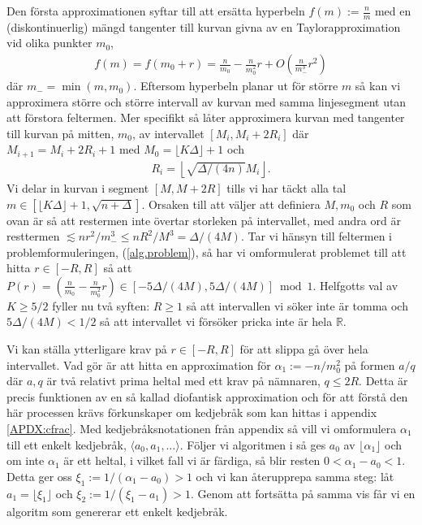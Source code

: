 Den första approximationen syftar till att ersätta hyperbeln \(f(m) := \frac{n}{m}\) med en (diskontinuerlig) mängd tangenter till kurvan givna av en Taylorapproximation vid olika punkter \(m_0\),
\begin{align*}
    f(m) = f(m_0 + r) = \frac{n}{m_0} - \frac{n}{m_0^2} r + O\left(\frac{n}{m_-^3} r^2 \right)
\end{align*} %
där \(m_- = \min(m, m_0)\). Eftersom hyperbeln planar ut för större $m$ så kan vi approximera större och större intervall av kurvan med samma linjesegment utan att förstora feltermen. Mer specifikt så låter \cite{HaraldSieve} approximera kurvan med tangenter till kurvan på mitten, $m_0$, av intervallet \([M_i, M_i + 2R_i]\) där  $M_{i + 1} = M_i + 2R_i + 1$ med $M_0 = \lfloor K \Delta \rfloor + 1$ och
\begin{align*}%
    R_i = \left\lfloor \sqrt{\Delta/(4n)} M_i \right\rfloor .
\end{align*}
Vi delar in kurvan i segment \([M, M + 2R]\) tills vi har täckt alla tal \(m \in [  \lfloor K \Delta \rfloor + 1, \sqrt{n + \Delta}]\). Orsaken till att \cite{HaraldSieve} väljer att definiera \(M, m_0\) och \(R\) som ovan är så att restermen inte övertar storleken på intervallet, med andra ord är resttermen \(\lesssim nr^2/m_-^3 \leq nR^2/M^3 = \Delta / (4M)\). Tar vi hänsyn till feltermen i problemformuleringen, (\ref{alg.problem}), så har vi omformulerat problemet till att hitta \(r \in [-R, R]\) så att \(P(r) = (\frac{n}{m_0} - \frac{n}{m_0^2} r) \in [-5\Delta/(4M), 5\Delta/(4M)] \bmod{1}\). Helfgotts val av \(K \geq 5/2\) fyller nu två syften: \(R \geq 1\) så att intervallen vi söker inte är tomma och \(5\Delta/(4M) < 1/2\) så att intervallet vi försöker pricka inte är hela \(\mathbb{R}\).

Vi kan ställa ytterligare krav på \(r \in [-R, R]\) för att slippa gå över hela intervallet. Vad \cite{HaraldSieve} gör är att hitta en approximation för \(\alpha_1 := -n/m_0^2\) på formen \(a/q\) där $a,q$ är två relativt prima heltal med ett krav på nämnaren, $q \leq 2R$. Detta är precis funktionen av en så kallad diofantisk approximation och för att förstå den här processen krävs förkunskaper om kedjebråk som kan hittas i appendix \ref{APDX:cfrac}. Med kedjebråksnotationen från appendix så vill vi omformulera \(\alpha_1\) till ett enkelt kedjebråk, \(\langle a_0, a_1, \dots \rangle\). Följer vi algoritmen i \cite[sats 21.5]{Lindahl} så ges \(a_0\) av \(\lfloor \alpha_1 \rfloor\) och om inte \(\alpha_1\) är ett heltal, i vilket fall vi är färdiga, så blir resten \(0 < \alpha_1 - a_0 < 1\). Detta ger oss \(\xi_1 := 1 / (\alpha_1 - a_0) > 1\) och vi kan återupprepa samma steg: låt \(a_1 = \lfloor \xi_1 \rfloor\) och \(\xi_2 := 1 / (\xi_1 - a_1) > 1\). Genom att fortsätta på samma vis får vi en algoritm som genererar ett enkelt kedjebråk. 


